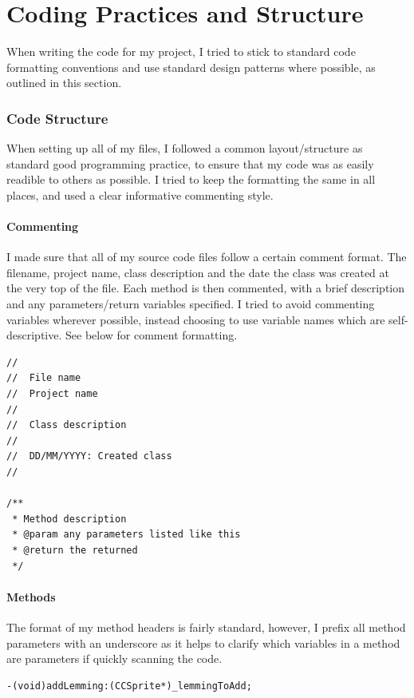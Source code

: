 \documentclass[a4paper,oneside]{report}
\begin{document}
\chapter{Coding Practices and Structure}

When writing the code for my project, I tried to stick to standard code formatting conventions and use standard design patterns where possible, as outlined in this section.

\subsection{Code Structure}

When setting up all of my files, I followed a common layout/structure as standard good programming practice, to ensure that my code was as easily readible to others as possible. I tried to keep the formatting the same in all places, and used a clear informative commenting style.

\subsubsection{Commenting}

I made sure that all of my source code files follow a certain comment format. The filename, project name, class description and the date the class was created at the very top of the file. Each method is then commented, with a brief description and any parameters/return variables specified. I tried to avoid commenting variables wherever possible, instead choosing to use variable names which are self-descriptive. See below for comment formatting.

\begin{lstlisting}
//
//  File name
//  Project name
//
//  Class description
//
//  DD/MM/YYYY: Created class
//

/**
 * Method description
 * @param any parameters listed like this
 * @return the returned
 */\end{lstlisting}

\subsubsection{Methods}

The format of my method headers is fairly standard, however, I prefix all method parameters with an underscore as it helps to clarify which variables in a method are parameters if quickly scanning the code.

\begin{lstlisting}
-(void)addLemming:(CCSprite*)_lemmingToAdd;
\end{lstlisting}
\end{document}

